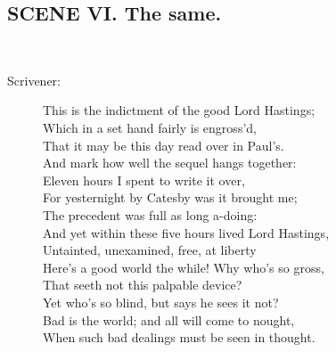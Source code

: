 \documentclass{article}
\begin{document}
\subsection*{SCENE VI.  The same.}
\\
\begin{description}
\item[Scrivener:] 
\hspace{1pt}This is the indictment of the good Lord Hastings;\\
\hspace{1pt}Which in a set hand fairly is engross'd,\\
\hspace{1pt}That it may be this day read over in Paul's.\\
\hspace{1pt}And mark how well the sequel hangs together:\\
\hspace{1pt}Eleven hours I spent to write it over,\\
\hspace{1pt}For yesternight by Catesby was it brought me;\\
\hspace{1pt}The precedent was full as long a-doing:\\
\hspace{1pt}And yet within these five hours lived Lord Hastings,\\
\hspace{1pt}Untainted, unexamined, free, at liberty\\
\hspace{1pt}Here's a good world the while! Why who's so gross,\\
\hspace{1pt}That seeth not this palpable device?\\
\hspace{1pt}Yet who's so blind, but says he sees it not?\\
\hspace{1pt}Bad is the world; and all will come to nought,\\
\hspace{1pt}When such bad dealings must be seen in thought.\\
\end{description}
\centering{\it [Exit]}\\
\end{document}
